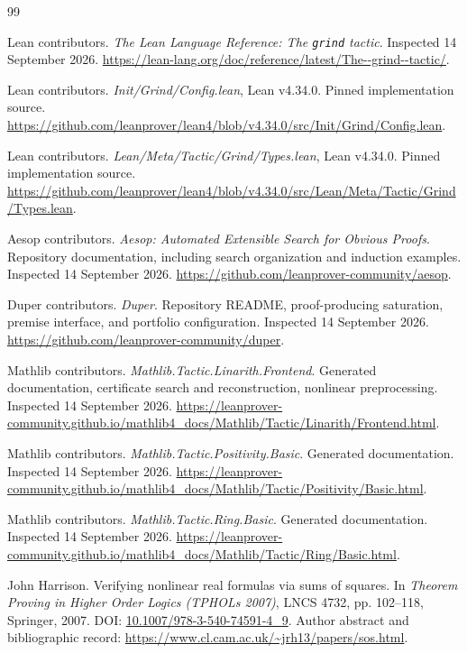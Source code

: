\documentclass[11pt,a4paper]{article}
\theoremstyle{definition}
\begin{document}
\clearpage
\begin{thebibliography}{99}
\small
\setlength{\itemsep}{3pt}
\setlength{\parskip}{0pt}
Lean contributors. \emph{The Lean Language Reference: The \texttt{grind} tactic}. Inspected 14 September 2026.
\url{https://lean-lang.org/doc/reference/latest/The--grind--tactic/}.

Lean contributors. \emph{Init/Grind/Config.lean}, Lean v4.34.0. Pinned implementation source.
\url{https://github.com/leanprover/lean4/blob/v4.34.0/src/Init/Grind/Config.lean}.

Lean contributors. \emph{Lean/Meta/Tactic/Grind/Types.lean}, Lean v4.34.0. Pinned implementation source.
\url{https://github.com/leanprover/lean4/blob/v4.34.0/src/Lean/Meta/Tactic/Grind/Types.lean}.

Aesop contributors. \emph{Aesop: Automated Extensible Search for Obvious Proofs}. Repository documentation, including search organization and induction examples. Inspected 14 September 2026.
\url{https://github.com/leanprover-community/aesop}.

Duper contributors. \emph{Duper}. Repository README, proof-producing saturation, premise interface, and portfolio configuration. Inspected 14 September 2026.
\url{https://github.com/leanprover-community/duper}.

Mathlib contributors. \emph{Mathlib.Tactic.Linarith.Frontend}. Generated documentation, certificate search and reconstruction, nonlinear preprocessing. Inspected 14 September 2026.
\url{https://leanprover-community.github.io/mathlib4_docs/Mathlib/Tactic/Linarith/Frontend.html}.

Mathlib contributors. \emph{Mathlib.Tactic.Positivity.Basic}. Generated documentation. Inspected 14 September 2026.
\url{https://leanprover-community.github.io/mathlib4_docs/Mathlib/Tactic/Positivity/Basic.html}.

Mathlib contributors. \emph{Mathlib.Tactic.Ring.Basic}. Generated documentation. Inspected 14 September 2026.
\url{https://leanprover-community.github.io/mathlib4_docs/Mathlib/Tactic/Ring/Basic.html}.

John Harrison. Verifying nonlinear real formulas via sums of squares. In \emph{Theorem Proving in Higher Order Logics (TPHOLs 2007)}, LNCS 4732, pp. 102--118, Springer, 2007.
DOI: \href{https://doi.org/10.1007/978-3-540-74591-4_9}{10.1007/978-3-540-74591-4\_9}.
Author abstract and bibliographic record:
\url{https://www.cl.cam.ac.uk/~jrh13/papers/sos.html}.


\end{thebibliography}
\end{document}

